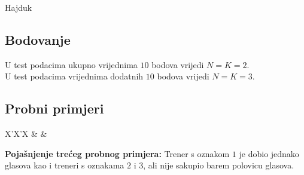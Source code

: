 \begin{statement}[
  problempoints=30,
  timelimit=1 sekunda,
  memorylimit=512 MiB,
]{Hajduk}
 \subsection*{Bodovanje}
U test podacima ukupno vrijednima $10$ bodova vrijedi $N=K=2$.\\
U test podacima vrijednima dodatnih $10$ bodova vrijedi $N=K=3$.

\subsection*{Probni primjeri}
\begin{tabularx}{\textwidth}{X'X'X}
 &
 &
\end{tabularx}

\textbf{Pojašnjenje trećeg probnog primjera:}
Trener s oznakom $1$ je dobio jednako glasova kao i treneri s oznakama $2$ i
$3$, ali nije sakupio barem polovicu glasova.

\end{statement}

